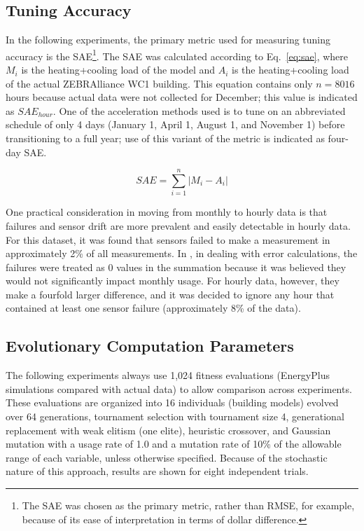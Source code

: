 \documentclass[preprint, review, 12pt]{elsarticle}
\begin{document}
\subsection{Tuning Accuracy}
In the following experiments, the primary metric used for measuring tuning accuracy is the SAE\footnote{The SAE was chosen as the primary metric, rather than RMSE, for example, because of its ease of interpretation in terms of dollar difference.}. The SAE was calculated according to Eq.~\ref{eq:sae}, where $M_i$ is the heating+cooling load of the model and $A_i$ is the heating+cooling load of the actual ZEBRAlliance WC1 building. This equation contains only  $n=8016$ hours because actual data were not collected for December; this value is indicated as $SAE_{hour}$. One of the acceleration methods used is to tune on an abbreviated schedule of only 4 days (January 1, April 1, August 1, and November 1) before transitioning to a full year; use of this variant of the metric is indicated as four-day SAE.

\begin{equation}
\label{eq:sae}
	SAE = \sum_{i=1}^{n}\left|M_i - A_i\right|
\end{equation}

One practical consideration in moving from monthly to hourly data is that failures and sensor drift are more prevalent and easily detectable in hourly data. For this dataset, it was found that sensors failed to make a measurement in approximately 2\% of all measurements. In \cite{cit:garrett2013}, in dealing with error calculations, the failures were treated as 0 values in the summation because it was believed they would not significantly impact monthly usage. For hourly data, however, they make a fourfold larger difference, and it was decided to ignore any hour that contained at least one sensor failure (approximately 8\% of the data).

\subsection{Evolutionary Computation Parameters}
The following experiments always use 1,024 fitness evaluations (EnergyPlus simulations compared with actual data) to allow comparison across experiments. These evaluations are organized into 16 individuals (building models) evolved over 64 generations, tournament selection with tournament size 4, generational replacement with weak elitism (one elite), heuristic crossover, and Gaussian mutation with a usage rate of 1.0 and a mutation rate of 10\% of the allowable range of each variable, unless otherwise specified. Because of the stochastic nature of this approach, results are shown for eight independent trials.
\end{document}
